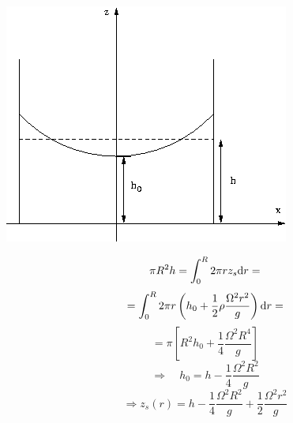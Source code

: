 \begin{minipage}{0.5\columnwidth}
	\begin{center}
		\includegraphics[width=\columnwidth]{TeX_files/chapter02-Hidrostatica/rotando}
	\end{center}
\end{minipage}
\begin{minipage}{0.5\columnwidth}
	\[
	\pi R^2 h = \int_0^R 2\pi r z_s \text{d} r =
	\]
	\[
	= \int_0^R 2\pi r\left(h_0 + \frac{1}{2}\rho\frac{\Omega^2r^2}{g}\right) \text{d} r =
	\]
	\[
	= \pi\left[R^2 h_0 + \frac{1}{4}\frac{\Omega^2 R^4}{g} \right]
	\]
	\[
	\Rightarrow \quad h_0 = h-\frac{1}{4}\frac{\Omega^2 R^2}{g}
	\]
	\[
	\Rightarrow z_s(r) = h-\frac{1}{4}\frac{\Omega^2 R^2}{g} + \frac{1}{2}\frac{\Omega^2 r^2}{g}
	\]
	
\end{minipage}